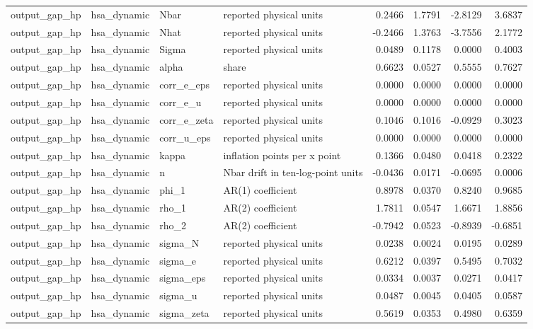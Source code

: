 \begin{tabular}{llllrrrr}
output\_gap\_hp & hsa\_dynamic & Nbar & reported physical units & 0.2466 & 1.7791 & -2.8129 & 3.6837 \\
output\_gap\_hp & hsa\_dynamic & Nhat & reported physical units & -0.2466 & 1.3763 & -3.7556 & 2.1772 \\
output\_gap\_hp & hsa\_dynamic & Sigma & reported physical units & 0.0489 & 0.1178 & 0.0000 & 0.4003 \\
output\_gap\_hp & hsa\_dynamic & alpha & share & 0.6623 & 0.0527 & 0.5555 & 0.7627 \\
output\_gap\_hp & hsa\_dynamic & corr\_e\_eps & reported physical units & 0.0000 & 0.0000 & 0.0000 & 0.0000 \\
output\_gap\_hp & hsa\_dynamic & corr\_e\_u & reported physical units & 0.0000 & 0.0000 & 0.0000 & 0.0000 \\
output\_gap\_hp & hsa\_dynamic & corr\_e\_zeta & reported physical units & 0.1046 & 0.1016 & -0.0929 & 0.3023 \\
output\_gap\_hp & hsa\_dynamic & corr\_u\_eps & reported physical units & 0.0000 & 0.0000 & 0.0000 & 0.0000 \\
output\_gap\_hp & hsa\_dynamic & kappa & inflation points per x point & 0.1366 & 0.0480 & 0.0418 & 0.2322 \\
output\_gap\_hp & hsa\_dynamic & n & Nbar drift in ten-log-point units & -0.0436 & 0.0171 & -0.0695 & 0.0006 \\
output\_gap\_hp & hsa\_dynamic & phi\_1 & AR(1) coefficient & 0.8978 & 0.0370 & 0.8240 & 0.9685 \\
output\_gap\_hp & hsa\_dynamic & rho\_1 & AR(2) coefficient & 1.7811 & 0.0547 & 1.6671 & 1.8856 \\
output\_gap\_hp & hsa\_dynamic & rho\_2 & AR(2) coefficient & -0.7942 & 0.0523 & -0.8939 & -0.6851 \\
output\_gap\_hp & hsa\_dynamic & sigma\_N & reported physical units & 0.0238 & 0.0024 & 0.0195 & 0.0289 \\
output\_gap\_hp & hsa\_dynamic & sigma\_e & reported physical units & 0.6212 & 0.0397 & 0.5495 & 0.7032 \\
output\_gap\_hp & hsa\_dynamic & sigma\_eps & reported physical units & 0.0334 & 0.0037 & 0.0271 & 0.0417 \\
output\_gap\_hp & hsa\_dynamic & sigma\_u & reported physical units & 0.0487 & 0.0045 & 0.0405 & 0.0587 \\
output\_gap\_hp & hsa\_dynamic & sigma\_zeta & reported physical units & 0.5619 & 0.0353 & 0.4980 & 0.6359 \\

\end{tabular}
